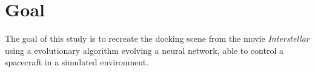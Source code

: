 \section{Goal}
The goal of this study is to recreate the docking scene from the movie
\textit{Interstellar} using a evolutionary algorithm evolving a neural network,
able to control a spacecraft in a simulated environment. 